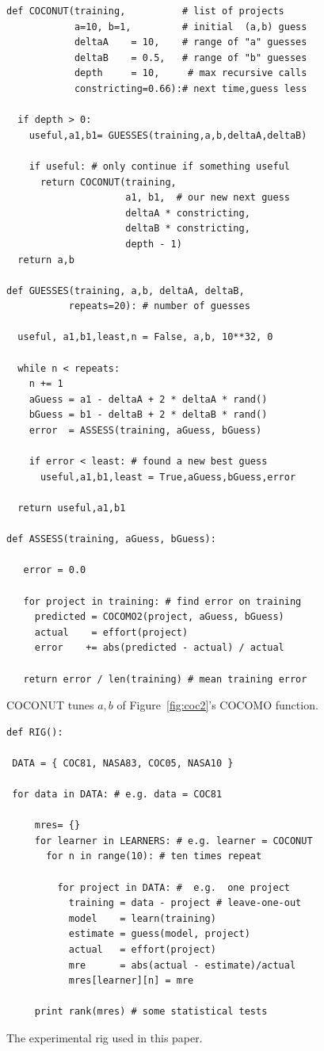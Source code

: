 \documentclass[smallcondesed]{svjour3}
\newcommand{\fig}[1]{Figure~\ref{fig:#1}}
\begin{document}
\begin{figure}
\begin{lstlisting}
def COCONUT(training,          # list of projects
            a=10, b=1,         # initial  (a,b) guess
            deltaA    = 10,    # range of "a" guesses 
            deltaB    = 0.5,   # range of "b" guesses
            depth     = 10,     # max recursive calls
            constricting=0.66):# next time,guess less
            
  if depth > 0:
    useful,a1,b1= GUESSES(training,a,b,deltaA,deltaB)
    
    if useful: # only continue if something useful
      return COCONUT(training, 
                     a1, b1,  # our new next guess
                     deltaA * constricting,
                     deltaB * constricting,
                     depth - 1)
  return a,b

def GUESSES(training, a,b, deltaA, deltaB,
           repeats=20): # number of guesses
           
  useful, a1,b1,least,n = False, a,b, 10**32, 0
  
  while n < repeats:
    n += 1
    aGuess = a1 - deltaA + 2 * deltaA * rand()
    bGuess = b1 - deltaB + 2 * deltaB * rand()
    error  = ASSESS(training, aGuess, bGuess)
    
    if error < least: # found a new best guess
      useful,a1,b1,least = True,aGuess,bGuess,error
      
  return useful,a1,b1

def ASSESS(training, aGuess, bGuess):

   error = 0.0
   
   for project in training: # find error on training
     predicted = COCOMO2(project, aGuess, bGuess)
     actual    = effort(project)
     error    += abs(predicted - actual) / actual
     
   return error / len(training) # mean training error
\end{lstlisting}
\caption{COCONUT  tunes  $a,b$ 
of \fig{coc2}'s COCOMO function.}\label{fig:coconut}
\end{figure}




\begin{figure}
\begin{lstlisting}
def RIG():

 DATA = { COC81, NASA83, COC05, NASA10 }
 
 for data in DATA: # e.g. data = COC81
 
     mres= {}
     for learner in LEARNERS: # e.g. learner = COCONUT 
       for n in range(10): # ten times repeat
       
         for project in DATA: #  e.g.  one project
           training = data - project # leave-one-out
           model    = learn(training)
           estimate = guess(model, project)
           actual   = effort(project)
           mre      = abs(actual - estimate)/actual
           mres[learner][n] = mre
           
     print rank(mres) # some statistical tests
\end{lstlisting}
\caption{The experimental rig used in this paper.}\label{fig:rig}
\end{figure}
\end{document}
